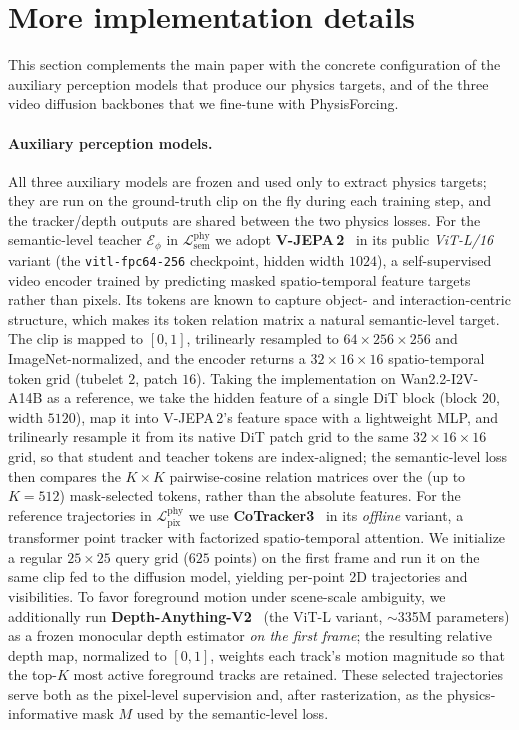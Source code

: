 \documentclass{llmxive}
\providecommand{\emph}[1]{\textit{#1}}
\begin{document}
\section{More implementation details}
\label{appx:impl}

This section complements the main paper with the concrete configuration of the
auxiliary perception models that produce our physics targets, and of the three video
diffusion backbones that we fine-tune with PhysisForcing.

\paragraph{Auxiliary perception models.}
All three auxiliary models are frozen and used only to extract physics targets;
they are run on the ground-truth clip on the fly during each training step, and
the tracker/depth outputs are shared between the two physics losses. For the
semantic-level teacher $\mathcal{E}_\phi$ in $\mathcal{L}^{\mathrm{phy}}_{\mathrm{sem}}$
we adopt \textbf{V-JEPA\,2}~\cite{bardes2024revisiting} in its public
\emph{ViT-L/16} variant (the \texttt{vitl-fpc64-256} checkpoint, hidden width
$1024$), a self-supervised video encoder trained by predicting masked
spatio-temporal feature targets rather than pixels. Its tokens are known to
capture object- and interaction-centric structure, which makes its token
relation matrix a natural semantic-level target. The clip is mapped to $[0,1]$,
trilinearly resampled to $64{\times}256{\times}256$ and ImageNet-normalized, and
the encoder returns a $32{\times}16{\times}16$ spatio-temporal token grid
(tubelet $2$, patch $16$). Taking the implementation on Wan2.2-I2V-A14B as a reference, we take the
hidden feature of a single DiT block (block $20$, width $5120$), map it into
V-JEPA\,2's feature space with a lightweight MLP, and trilinearly resample it from its native DiT patch grid to
the same $32{\times}16{\times}16$ grid, so that student and teacher tokens are
index-aligned; the semantic-level loss then compares the $K{\times}K$ pairwise-cosine
relation matrices over the (up to $K{=}512$) mask-selected tokens, rather than
the absolute features. For the reference trajectories in
$\mathcal{L}^{\mathrm{phy}}_{\mathrm{pix}}$ we use \textbf{CoTracker3}~\cite{karaev24cotracker3}
in its \emph{offline} variant, a transformer point tracker with factorized
spatio-temporal attention. We initialize a regular $25{\times}25$ query grid
($625$ points) on the first frame and run it on the same clip fed to the
diffusion model, yielding per-point 2D trajectories and visibilities. To favor
foreground motion under scene-scale ambiguity, we additionally run
\textbf{Depth-Anything-V2}~\cite{yang2024depth} (the ViT-L variant,
$\sim$335M parameters) as a frozen monocular depth estimator \emph{on the first
frame}; the resulting relative depth map, normalized to $[0,1]$, weights each
track's motion magnitude so that the top-$K$ most active foreground tracks are
retained. These selected trajectories serve both as the pixel-level supervision
and, after rasterization, as the physics-informative mask $M$ used by the
semantic-level loss.
\end{document}
